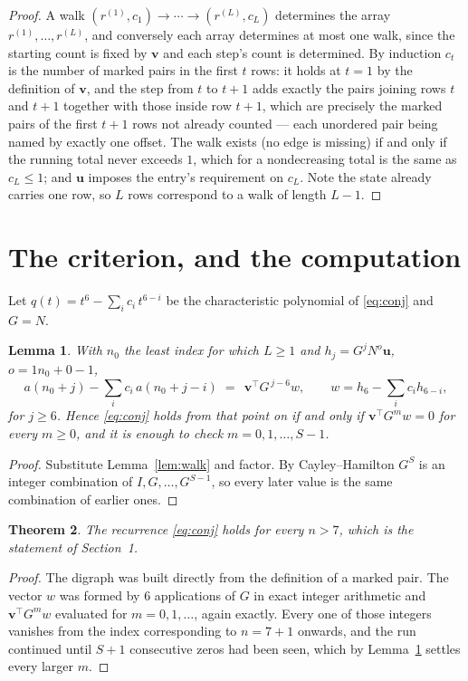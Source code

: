 \documentclass[11pt,a4paper]{article}
\theoremstyle{plain}
\newtheorem{theorem}{Theorem}
\newtheorem{lemma}[theorem]{Lemma}
\theoremstyle{definition}
\begin{document}
\begin{proof}
A walk $(r^{(1)},c_1)\to\cdots\to(r^{(L)},c_L)$ determines the array
$r^{(1)},\dots,r^{(L)}$, and conversely each array determines at most one walk, since the
starting count is fixed by $\mathbf{v}$ and each step's count is determined. By induction
$c_t$ is the number of marked pairs in the first $t$ rows: it holds at $t=1$ by the
definition of $\mathbf{v}$, and the step from $t$ to $t+1$ adds exactly the pairs joining
rows $t$ and $t+1$ together with those inside row $t+1$, which are precisely the marked
pairs of the first $t+1$ rows not already counted --- each unordered pair being named by
exactly one offset. The walk exists (no edge is missing) if and only if the running total
never exceeds $1$, which for a nondecreasing total is the same as $c_L\le1$; and
$\mathbf{u}$ imposes the entry's requirement on $c_L$. Note the state already carries one
row, so $L$ rows correspond to a walk of length $L-1$.
\end{proof}

\section{The criterion, and the computation}

Let $q(t)=t^{6}-\sum_i c_i\,t^{6-i}$ be the characteristic polynomial of
\eqref{eq:conj} and $G=N$.

\begin{lemma}\label{lem:crit}
With $n_0$ the least index for which $L\ge1$ and $h_j=G^{j}N^{o}\mathbf{u}$,
$o=1n_0+0-1$,
\[
a(n_0+j)-\sum_i c_i\,a(n_0+j-i)\;=\;\,\mathbf{v}^{\!\top}G^{\,j-6}w,
\qquad w=h_{6}-\sum_i c_i h_{6-i},
\]
for $j\ge6$. Hence \eqref{eq:conj} holds from that point on if and only if
$\mathbf{v}^{\!\top}G^{m}w=0$ for every $m\ge0$, and it is enough to check
$m=0,1,\dots,S-1$.
\end{lemma}

\begin{proof}
Substitute Lemma~\ref{lem:walk} and factor. By Cayley--Hamilton $G^{S}$ is an integer
combination of $I,G,\dots,G^{S-1}$, so every later value is the same combination of earlier
ones.
\end{proof}

\begin{theorem}
The recurrence \eqref{eq:conj} holds for every $n>7$, which is the statement of
Section~1.
\end{theorem}

\begin{proof}
The digraph was built directly from the definition of a marked pair. The vector $w$ was
formed by $6$ applications of $G$ in exact integer arithmetic and
$\mathbf{v}^{\!\top}G^{m}w$ evaluated for $m=0,1,\dots$, again exactly. Every one of
those integers vanishes from the index corresponding to $n=7+1$ onwards, and the run
continued until $S+1$ consecutive zeros had been seen, which by Lemma~\ref{lem:crit}
settles every larger $m$.
\end{proof}
\end{document}
